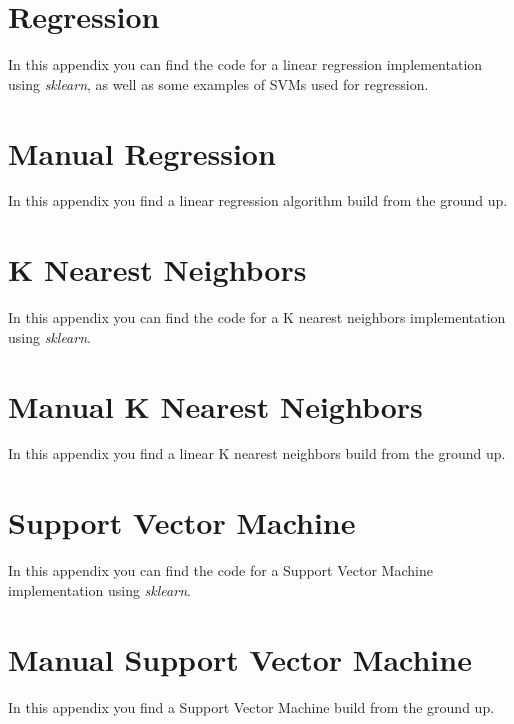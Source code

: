 \chapter{Regression}\label{code:regression}

In this appendix you can find the code for a linear regression implementation using \emph{sklearn}, as well as some examples of SVMs used for regression.


\chapter{Manual Regression}\label{code:manualregression}
In this appendix you find a linear regression algorithm build from the ground up.


\chapter{K Nearest Neighbors}\label{code:knn}
In this appendix you can find the code for a K nearest neighbors implementation using \emph{sklearn}.


\chapter{Manual K Nearest Neighbors}\label{code:mknn}
In this appendix you find a linear K nearest neighbors build from the ground up.


\chapter{Support Vector Machine}\label{code:svm}
In this appendix you can find the code for a Support Vector Machine implementation using \emph{sklearn}.


\chapter{Manual Support Vector Machine}\label{code:msvm}
In this appendix you find a Support Vector Machine build from the ground up.


